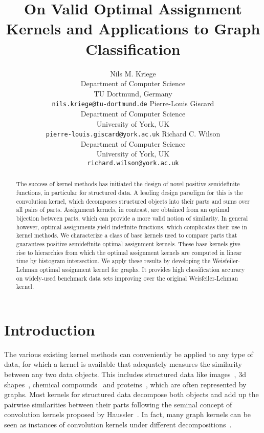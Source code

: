 \documentclass{article}
\title{On Valid Optimal Assignment Kernels and Applications to Graph Classification}
\author{
  Nils M. Kriege\\
  Department of Computer Science\\
  TU Dortmund, Germany\\
  \texttt{nils.kriege@tu-dortmund.de}
  \And 
  Pierre-Louis Giscard\\
  Department of Computer Science\\
  University of York, UK\\
  \texttt{pierre-louis.giscard@york.ac.uk}
  \And
  Richard C. Wilson\\
  Department of Computer Science\\
  University of York, UK\\
  \texttt{richard.wilson@york.ac.uk}
}
\begin{document}
\maketitle

\begin{abstract}
The success of kernel methods has initiated the design of novel positive 
semidefinite functions, in particular for structured data.
A leading design paradigm for this is the convolution kernel, which decomposes 
structured objects into their parts and sums over all pairs of parts.
Assignment kernels, in contrast, are obtained from an optimal bijection between 
parts, which can provide a more valid notion of similarity.
In general however, optimal assignments yield indefinite functions, which
complicates their use in kernel methods. We characterize a class of base 
kernels used to compare parts that guarantees positive semidefinite optimal assignment kernels.
These base kernels give rise to hierarchies from which the optimal assignment 
kernels are computed in linear time by histogram intersection. We apply these 
results by developing the Weisfeiler-Lehman optimal assignment kernel for graphs. 
It provides high classification accuracy on widely-used benchmark data sets 
improving over the original Weisfeiler-Lehman kernel.
\end{abstract}



\section{Introduction}
The various existing kernel methods can conveniently be applied to any type of 
data, for which a kernel is available that adequately measures the similarity
between any two data objects. 
This includes structured data like images~\cite{Barla2003,Boughorbel2005,Grauman2007},
3d shapes~\cite{Bai2015}, chemical compounds~\cite{Frohlich2005} and 
proteins~\cite{Borgwardt2005a}, which are often represented by graphs. 
Most kernels for structured data decompose both objects and add up the pairwise similarities between
their parts following the seminal concept of convolution kernels proposed by 
Haussler~\cite{Haussler1999}. In fact, many graph kernels can be seen as 
instances of convolution kernels under different decompositions~\cite{Vishwanathan2010}.
\end{document}
